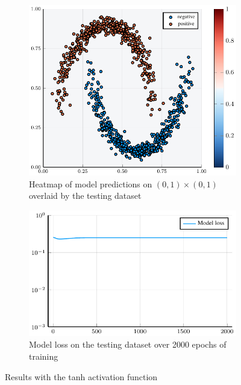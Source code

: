 \begin{figure}
	\centering
	\begin{subfigure}{0.49\textwidth}
		\centering
		\includegraphics[width=\textwidth]{images/tanh-heatmap/tanh.pdf}
		\caption{Heatmap of model predictions on \( \left( 0, 1 \right) \times \left( 0, 1 \right) \) overlaid by the testing dataset}
	\end{subfigure}
	\begin{subfigure}{0.49\textwidth}
		\centering
		\includegraphics[width=\textwidth]{images/tanh-modelloss/tanh.pdf}
		\caption{Model loss on the testing dataset over 2000 epochs of training}
	\end{subfigure}
	\caption{Results with the tanh activation function}\label{tanh}
\end{figure}

